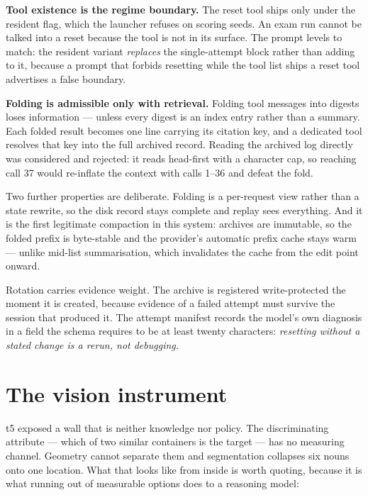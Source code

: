 \documentclass[11pt,a4paper]{report}
\newcommand{\keyrule}[1]{\textbf{\textcolor{acc}{#1}}}
\begin{document}
\keyrule{Tool existence is the regime boundary.} The reset tool ships only under the
resident flag, which the launcher refuses on scoring seeds. An exam run cannot
be talked into a reset because the tool is not in its surface. The prompt levels
to match: the resident variant \emph{replaces} the single-attempt block rather
than adding to it, because a prompt that forbids resetting while the tool list
ships a reset tool advertises a false boundary.

\keyrule{Folding is admissible only with retrieval.} Folding tool messages into
digests loses information --- unless every digest is an index entry rather than
a summary. Each folded result becomes one line carrying its citation key, and a
dedicated tool resolves that key into the full archived record. Reading the
archived log directly was considered and rejected: it reads head-first with a
character cap, so reaching call 37 would re-inflate the context with calls 1--36
and defeat the fold.

Two further properties are deliberate. Folding is a per-request view rather than
a state rewrite, so the disk record stays complete and replay sees everything.
And it is the first legitimate compaction in this system: archives are
immutable, so the folded prefix is byte-stable and the provider's automatic
prefix cache stays warm --- unlike mid-list summarisation, which invalidates the
cache from the edit point onward.

Rotation carries evidence weight. The archive is registered write-protected the
moment it is created, because evidence of a failed attempt must survive the
session that produced it. The attempt manifest records the model's own diagnosis
in a field the schema requires to be at least twenty characters: \emph{resetting
without a stated change is a rerun, not debugging.}

\chapter{The vision instrument}

t5 exposed a wall that is neither knowledge nor policy. The discriminating
attribute --- which of two similar containers is the target --- has no measuring
channel. Geometry cannot separate them and segmentation collapses six nouns onto
one location. What that looks like from inside is worth quoting, because it is
what running out of measurable options does to a reasoning model:
\end{document}
